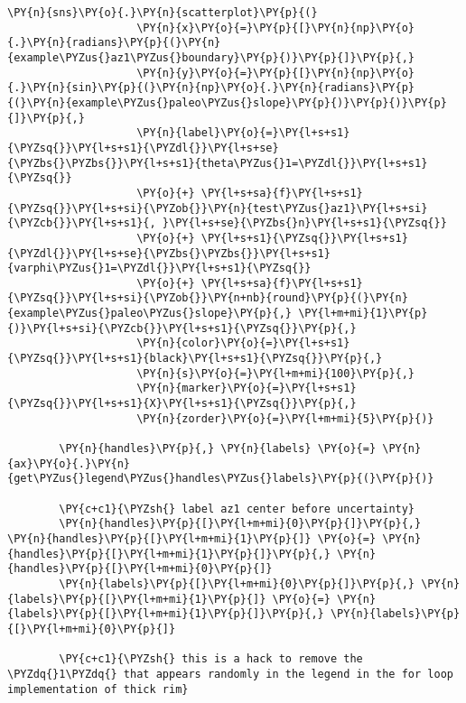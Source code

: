 \begin{tcolorbox}[breakable, size=fbox, boxrule=1pt, pad at break*=1mm,colback=cellbackground, colframe=cellborder]
\begin{Verbatim}[commandchars=\\\{\}]
                \PY{n}{sns}\PY{o}{.}\PY{n}{scatterplot}\PY{p}{(}
                    \PY{n}{x}\PY{o}{=}\PY{p}{[}\PY{n}{np}\PY{o}{.}\PY{n}{radians}\PY{p}{(}\PY{n}{example\PYZus{}az1\PYZus{}boundary}\PY{p}{)}\PY{p}{]}\PY{p}{,}
                    \PY{n}{y}\PY{o}{=}\PY{p}{[}\PY{n}{np}\PY{o}{.}\PY{n}{sin}\PY{p}{(}\PY{n}{np}\PY{o}{.}\PY{n}{radians}\PY{p}{(}\PY{n}{example\PYZus{}paleo\PYZus{}slope}\PY{p}{)}\PY{p}{)}\PY{p}{]}\PY{p}{,}
                    \PY{n}{label}\PY{o}{=}\PY{l+s+s1}{\PYZsq{}}\PY{l+s+s1}{\PYZdl{}}\PY{l+s+se}{\PYZbs{}\PYZbs{}}\PY{l+s+s1}{theta\PYZus{}1=\PYZdl{}}\PY{l+s+s1}{\PYZsq{}}
                    \PY{o}{+} \PY{l+s+sa}{f}\PY{l+s+s1}{\PYZsq{}}\PY{l+s+si}{\PYZob{}}\PY{n}{test\PYZus{}az1}\PY{l+s+si}{\PYZcb{}}\PY{l+s+s1}{, }\PY{l+s+se}{\PYZbs{}n}\PY{l+s+s1}{\PYZsq{}}
                    \PY{o}{+} \PY{l+s+s1}{\PYZsq{}}\PY{l+s+s1}{\PYZdl{}}\PY{l+s+se}{\PYZbs{}\PYZbs{}}\PY{l+s+s1}{varphi\PYZus{}1=\PYZdl{}}\PY{l+s+s1}{\PYZsq{}}
                    \PY{o}{+} \PY{l+s+sa}{f}\PY{l+s+s1}{\PYZsq{}}\PY{l+s+si}{\PYZob{}}\PY{n+nb}{round}\PY{p}{(}\PY{n}{example\PYZus{}paleo\PYZus{}slope}\PY{p}{,} \PY{l+m+mi}{1}\PY{p}{)}\PY{l+s+si}{\PYZcb{}}\PY{l+s+s1}{\PYZsq{}}\PY{p}{,}
                    \PY{n}{color}\PY{o}{=}\PY{l+s+s1}{\PYZsq{}}\PY{l+s+s1}{black}\PY{l+s+s1}{\PYZsq{}}\PY{p}{,}
                    \PY{n}{s}\PY{o}{=}\PY{l+m+mi}{100}\PY{p}{,}
                    \PY{n}{marker}\PY{o}{=}\PY{l+s+s1}{\PYZsq{}}\PY{l+s+s1}{X}\PY{l+s+s1}{\PYZsq{}}\PY{p}{,}
                    \PY{n}{zorder}\PY{o}{=}\PY{l+m+mi}{5}\PY{p}{)}
    
        \PY{n}{handles}\PY{p}{,} \PY{n}{labels} \PY{o}{=} \PY{n}{ax}\PY{o}{.}\PY{n}{get\PYZus{}legend\PYZus{}handles\PYZus{}labels}\PY{p}{(}\PY{p}{)}
    
        \PY{c+c1}{\PYZsh{} label az1 center before uncertainty}
        \PY{n}{handles}\PY{p}{[}\PY{l+m+mi}{0}\PY{p}{]}\PY{p}{,} \PY{n}{handles}\PY{p}{[}\PY{l+m+mi}{1}\PY{p}{]} \PY{o}{=} \PY{n}{handles}\PY{p}{[}\PY{l+m+mi}{1}\PY{p}{]}\PY{p}{,} \PY{n}{handles}\PY{p}{[}\PY{l+m+mi}{0}\PY{p}{]}
        \PY{n}{labels}\PY{p}{[}\PY{l+m+mi}{0}\PY{p}{]}\PY{p}{,} \PY{n}{labels}\PY{p}{[}\PY{l+m+mi}{1}\PY{p}{]} \PY{o}{=} \PY{n}{labels}\PY{p}{[}\PY{l+m+mi}{1}\PY{p}{]}\PY{p}{,} \PY{n}{labels}\PY{p}{[}\PY{l+m+mi}{0}\PY{p}{]}
    
        \PY{c+c1}{\PYZsh{} this is a hack to remove the \PYZdq{}1\PYZdq{} that appears randomly in the legend in the for loop implementation of thick rim}
    

\end{Verbatim}
\end{tcolorbox}
